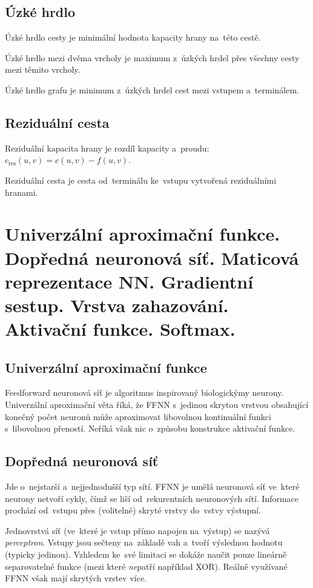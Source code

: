 \subsection{Úzké hrdlo}

Úzké hrdlo cesty je minimální hodnota kapacity hrany na~této cestě.

Úzké hrdlo mezi dvěma vrcholy je maximum z~úzkých hrdel přes všechny cesty mezi těmito vrcholy.

Úzké hrdlo grafu je minimum z~úzkých hrdel cest mezi vstupem a~terminálem.

\subsection{Reziduální cesta}

Reziduální kapacita hrany je rozdíl kapacity a~proudu: $c_\mathrm{res}(u,v) = c(u,v) - f(u,v)$.

Reziduální cesta je cesta od~terminálu ke~vstupu vytvořená reziduálními hranami.

\clearpage
\section{Univerzální aproximační funkce. Dopředná neuronová síť. Maticová reprezentace NN. Gradientní sestup. Vrstva zahazování. Aktivační funkce. Softmax.}

\subsection{Univerzální aproximační funkce}

Feedforward neuronová síť je algoritmus inspirovaný biologickýmy neurony.
Univerzální aproximační věta říká, že FFNN s~jedinou skrytou vrstvou obsahující konečný počet neuronů může aproximovat libovolnou kontinuální funkci s~libovolnou přeností.
Neříká však nic o~způsobu konstrukce aktivační funkce.

\subsection{Dopředná neuronová síť}

Jde o~nejstarší a~nejjednodušší typ sítí.
FFNN je umělá neuronová síť ve~které neurony netvoří cykly, čímž se liší od~rekurentních neuronových sítí.
Informace prochází od~vstupu přes (volitelné) skryté vrstvy do~vstvy výstupní.

Jednovrstvá síť (ve~které je vstup přímo napojen na~výstup) se nazývá \emph{perceptron}.
Vstupy jsou sečteny na~základě vah a~tvoří výslednou hodnotu (typicky jedinou).
Vzhledem ke~své limitaci se dokáže naučit pouze lineárně separovatelné funkce (mezi které \emph{ne}patří například XOR).
Reálně využívané FFNN však mají skrytých vrstev více.

